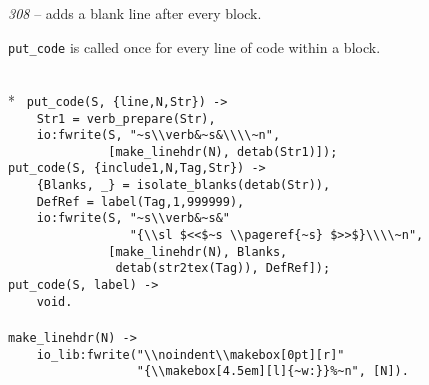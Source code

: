 {\sl 308} -- adds a blank line after every block.

\verb+put_code+ is called once for every line of code within a block.

\begin{flushleft}
\label{eweave_9_14}
\\*
\tt
\noindent{}%
\verb&put_code(S, {line,N,Str}) ->&\\
\noindent{}%
\verb&    Str1 = verb_prepare(Str),&\\
\noindent{}%
\verb&    io:fwrite(S, "~s\\verb&\verb+&+\verb&~s&\verb+&+\verb&\\\\~n",&\\
\noindent{}%
\verb&              [make_linehdr(N), detab(Str1)]);&\\
\noindent{}%
\verb&put_code(S, {include1,N,Tag,Str}) ->&\\
\noindent{}%
\verb&    {Blanks, _} = isolate_blanks(detab(Str)),&\\
\noindent{}%
\verb&    DefRef = label(Tag,1,999999),&\\
\noindent{}%
\verb&    io:fwrite(S, "~s\\verb&\verb+&+\verb&~s&\verb+&+\verb&"&\\
\noindent{}%
\verb&                 "{\\sl $<<$~s \\pageref{~s} $>>$}\\\\~n",&\\
\noindent{}%
\verb&              [make_linehdr(N), Blanks,&\\
\noindent{}%
\verb&               detab(str2tex(Tag)), DefRef]);&\\
\noindent{}%
\verb&put_code(S, label) ->&\\
\noindent{}%
\verb&    void.&\\
\noindent{}%
\verb&&\\
\noindent{}%
\verb&make_linehdr(N) ->&\\
\noindent{}%
\verb&    io_lib:fwrite("\\noindent\\makebox[0pt][r]"&\\
\noindent{}%
\verb&                  "{\\makebox[4.5em][l]{~w:}}%~n", [N]).&\\
\end{flushleft}

